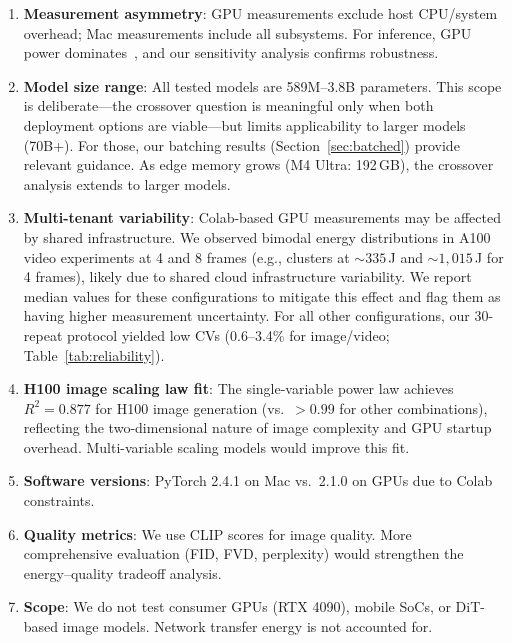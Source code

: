 \documentclass[acmlarge,manuscript,screen,review]{acmart}
\begin{document}
\begin{enumerate}[leftmargin=*]
\item \textbf{Measurement asymmetry}: GPU measurements exclude host CPU/system overhead; Mac measurements include all subsystems. For inference, GPU power dominates~\cite{patterson2021carbon,wu2022sustainable}, and our sensitivity analysis confirms robustness.

\item \textbf{Model size range}: All tested models are 589M--3.8B parameters. This scope is deliberate---the crossover question is meaningful only when both deployment options are viable---but limits applicability to larger models (70B+). For those, our batching results (Section~\ref{sec:batched}) provide relevant guidance. As edge memory grows (M4 Ultra: 192\,GB), the crossover analysis extends to larger models.

\item \textbf{Multi-tenant variability}: Colab-based GPU measurements may be affected by shared infrastructure. We observed bimodal energy distributions in A100 video experiments at 4 and 8 frames (e.g., clusters at ${\sim}335$\,J and ${\sim}1{,}015$\,J for 4 frames), likely due to shared cloud infrastructure variability. We report median values for these configurations to mitigate this effect and flag them as having higher measurement uncertainty. For all other configurations, our 30-repeat protocol yielded low CVs (0.6--3.4\% for image/video; Table~\ref{tab:reliability}).

\item \textbf{H100 image scaling law fit}: The single-variable power law achieves $R^2 = 0.877$ for H100 image generation (vs.\ $>0.99$ for other combinations), reflecting the two-dimensional nature of image complexity and GPU startup overhead. Multi-variable scaling models would improve this fit.

\item \textbf{Software versions}: PyTorch 2.4.1 on Mac vs.\ 2.1.0 on GPUs due to Colab constraints.

\item \textbf{Quality metrics}: We use CLIP scores for image quality. More comprehensive evaluation (FID, FVD, perplexity) would strengthen the energy--quality tradeoff analysis.

\item \textbf{Scope}: We do not test consumer GPUs (RTX 4090), mobile SoCs, or DiT-based image models. Network transfer energy is not accounted for.
\end{enumerate}
\end{document}
